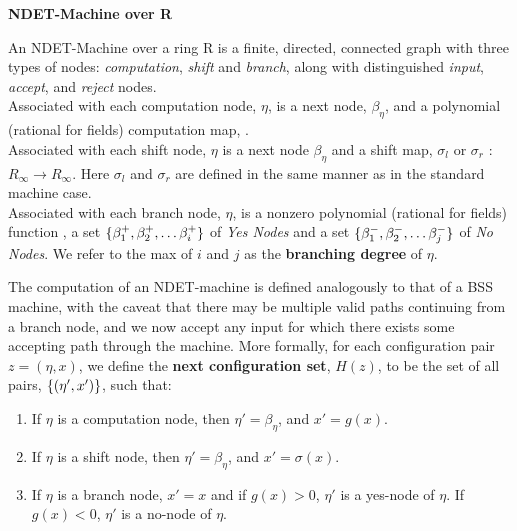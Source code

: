 \begin{definition} \textbf{NDET-Machine over R}

  An NDET-Machine over a ring R is a finite, directed, connected graph
  with three types of nodes: \emph{computation}, \emph{shift} and
  \emph{branch}, along with distinguished \emph{input}, \emph{accept}, 
  and \emph{reject} nodes.\\

  Associated with each computation node, $\eta$, is a next node,
  $\beta_{\eta}$, and a polynomial (rational for fields) computation
  map, .\\

  Associated with each shift node, $\eta$ is a next node $\beta_\eta$
  and a shift map, $\sigma_l$ or $\sigma_r$ : $R_\infty \rightarrow
  R_\infty$. Here $\sigma_l$ and $\sigma_r$ are defined in the same
  manner as in the standard machine case.\\

  Associated with each branch node, $\eta$, is a nonzero polynomial
  (rational for fields) function , a set
  $\{\beta^+_1, \beta^+_2, \ldots \beta^+_i\}$ of \emph{Yes Nodes}
  and a set $\{\beta^-_1, \beta^-_2, \ldots \beta^-_j\}$ of \emph{No
    Nodes}.  We refer to the max of $i$ and $j$ as the
  \textbf{branching degree} of $\eta$.\\
\end{definition}


The computation of an NDET-machine is defined analogously to that of a
BSS machine, with the caveat that there may be multiple valid
paths continuing from a branch node, and we now accept any input for which
there exists some accepting path through the machine.  More formally,
for each configuration pair $z = (\eta, x)$, we define the
\textbf{next configuration set}, $H(z)$, to be the set of all pairs,
$\{(\eta', x')\}$, such that:

\begin{enumerate}
\item If $\eta$ is a computation node, then $\eta' = \beta_\eta$, and
  $x' = g(x)$.
\item If $\eta$ is a shift node, then $\eta' = \beta_\eta$, and
  $x' = \sigma(x)$.
\item If $\eta$ is a branch node, $x' = x$ and if $g(x) > 0$, $\eta'$
  is a yes-node of $\eta$.  If $g(x) < 0$, $\eta'$ is a no-node of
  $\eta$.
\end{enumerate}

